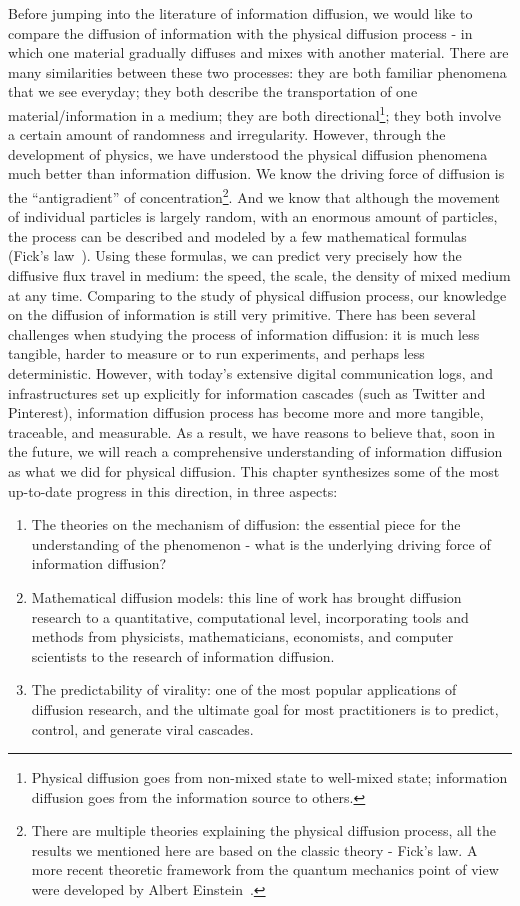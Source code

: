 \documentclass[phd,tocprelim]{cornell}
\begin{document}
Before jumping into the literature of information diffusion, we would like to compare the diffusion of information with the physical diffusion process - in which one material gradually diffuses and mixes with another material. There are many similarities between these two processes: they are both familiar phenomena that we see everyday; they both describe the transportation of one material/information in a medium; they are both directional\footnote{Physical diffusion goes from non-mixed state to well-mixed state; information diffusion goes from the information source to others.}; they both involve a certain amount of randomness and irregularity. However, through the development of physics, we have understood the physical diffusion phenomena much better than information diffusion. We know the driving force of diffusion is the ``antigradient'' of concentration\footnote{There are multiple theories explaining the physical diffusion process, all the results we mentioned here are based on the classic theory - Fick's law. A more recent theoretic framework from the quantum mechanics point of view were developed by Albert Einstein~\cite{einstein-1905}.}. And we know that although the movement of individual particles is largely random, with an enormous amount of particles, the process can be described and modeled by a few mathematical formulas (Fick's law~\cite{Fick-1855}). 
Using these formulas, we can predict very precisely how the diffusive flux travel in medium: the speed, the scale, the density of mixed medium at any time. 
Comparing to the study of physical diffusion process, our knowledge on the diffusion of information is still very primitive. There has been several challenges when studying the process of information diffusion: it is much less tangible, harder to measure or to run experiments, and perhaps less deterministic. However, with today's extensive digital communication logs, and infrastructures set up explicitly for information cascades (such as Twitter and Pinterest), information diffusion process has become more and more tangible, traceable, and measurable. As a result, we have reasons to believe that, soon in the future, we will reach a comprehensive understanding of information diffusion as what we did for physical diffusion. This chapter synthesizes some of the most up-to-date progress in this direction, in three aspects:
\begin{enumerate}
\item The theories on the mechanism of diffusion: the essential piece for the understanding of the phenomenon - what is the underlying driving force of information diffusion?
\item Mathematical diffusion models: this line of work has brought diffusion research to a quantitative, computational level, incorporating tools and methods from physicists, mathematicians, economists, and computer scientists to the research of information diffusion.
\item The predictability of virality: one of the most popular applications of diffusion research, and the ultimate goal for most practitioners is to predict, control, and generate viral cascades.
\end{enumerate}
\end{document}
